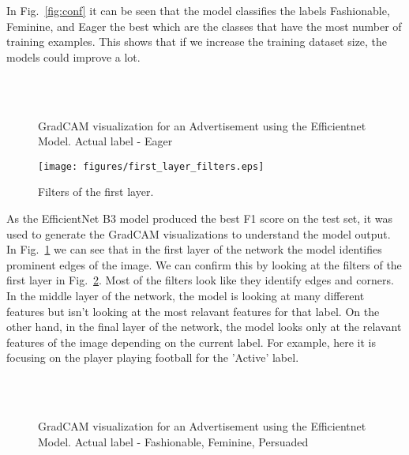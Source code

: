 \documentclass[conference]{IEEEtran}
\begin{document}
In Fig.~\ref{fig:conf} it can be seen that the model classifies the labels Fashionable, Feminine, and Eager the best which are the classes that have the most number of training examples. This shows that if we increase the training dataset size, the models could improve a lot.

\begin{figure}
    
    \\
    \\
    \caption{GradCAM visualization for an Advertisement using the Efficientnet Model. Actual label - Eager}
    \label{fig:gradcam_1}
  \end{figure}

  \begin{figure}[htbp]
    \centering
    \texttt{[image: figures/first\_layer\_filters.eps]}  
    \caption{Filters of the first layer.}
    \label{fig:filters}
  \end{figure}

As the EfficientNet B3 model produced the best F1 score on the test set, it was used 
to generate the GradCAM visualizations to understand the model output. In Fig.~\ref{fig:gradcam_1} we can see that in the first layer of the network the model 
identifies prominent edges of the image. We can confirm this by looking at the filters of the first layer in Fig.~\ref{fig:filters}. Most of the filters look like they identify edges and corners. In the middle layer of the network, the model is looking at many different features but isn't looking at the most relavant features for that label. On the other hand, in the final layer of the network, the model looks only at the relavant features of the image depending on the current label. For example, here it is focusing on the player playing football for the 'Active' label. 

\begin{figure}
    
    \\
    \\
    \caption{GradCAM visualization for an Advertisement using the Efficientnet Model. Actual label - Fashionable, Feminine, Persuaded}
    \label{fig:gradcam_2}
  \end{figure}
\end{document}
